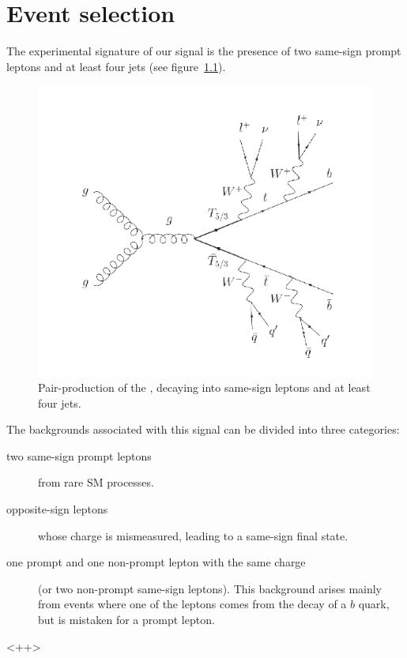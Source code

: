 \chapter{Event selection}
The experimental signature of our signal is the presence of two same-sign
prompt leptons and at least four jets (see figure~\ref{fig:TTbar_feynman}).

\begin{figure}[htb]
    \centering
    \includegraphics[width=\textwidth]{images/pdf/TTbar_feynman}

    \caption{Pair-production of the \TP, decaying into same-sign leptons and
    at least four jets.}
    \label{fig:TTbar_feynman}
\end{figure}

The backgrounds associated with this signal can be divided into three
categories:
\begin{description}
    \item[two same-sign prompt leptons] from rare SM processes.
    \item[opposite-sign leptons] whose charge is mismeasured, leading to a
        same-sign final state.
    \item[one prompt and one non-prompt lepton with the same charge] (or two
        non-prompt same-sign leptons). This background arises mainly from
        \ttbar events where one of the leptons comes from the decay of a
        $b$ quark, but is mistaken for a prompt lepton.
\end{description}<++>

